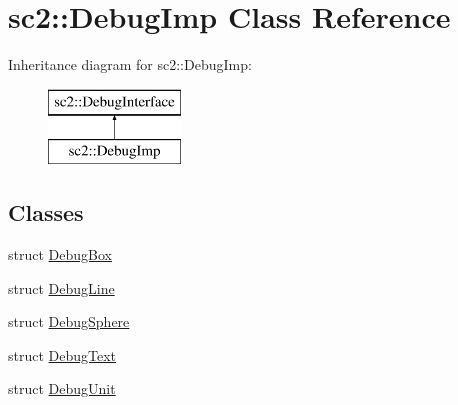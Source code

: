 \hypertarget{classsc2_1_1_debug_imp}{}\section{sc2\+:\+:Debug\+Imp Class Reference}
\label{classsc2_1_1_debug_imp}
Inheritance diagram for sc2\+:\+:Debug\+Imp\+:\begin{figure}[H]
\begin{center}
\leavevmode
\includegraphics[height=2.000000cm]{classsc2_1_1_debug_imp}
\end{center}
\end{figure}
\subsection*{Classes}
\begin{DoxyCompactItemize}
\item 
struct \hyperlink{structsc2_1_1_debug_imp_1_1_debug_box}{Debug\+Box}
\item 
struct \hyperlink{structsc2_1_1_debug_imp_1_1_debug_line}{Debug\+Line}
\item 
struct \hyperlink{structsc2_1_1_debug_imp_1_1_debug_sphere}{Debug\+Sphere}
\item 
struct \hyperlink{structsc2_1_1_debug_imp_1_1_debug_text}{Debug\+Text}
\item 
struct \hyperlink{structsc2_1_1_debug_imp_1_1_debug_unit}{Debug\+Unit}
\end{DoxyCompactItemize}
